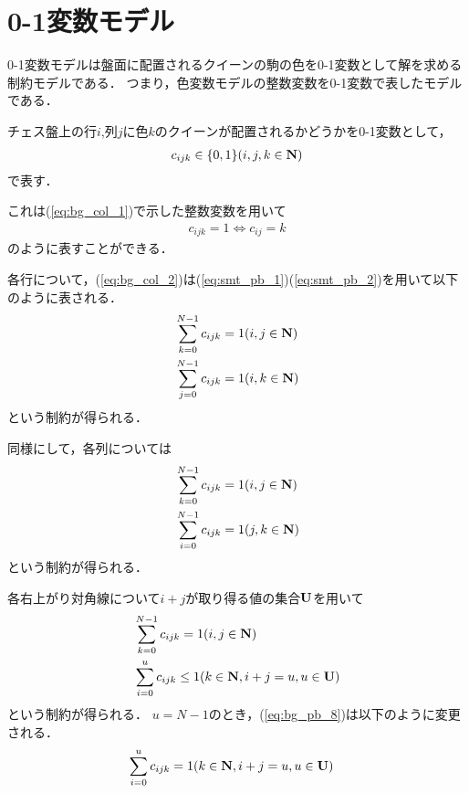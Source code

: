 \section{0-1変数モデル}\label{sec:bg_pb}
0-1変数モデルは盤面に配置されるクイーンの駒の色を0-1変数として解を求める制約モデルである．
つまり，色変数モデルの整数変数を0-1変数で表したモデルである．

チェス盤上の行$i$,列$j$に色$k$のクイーンが配置されるかどうかを0-1変数として，
\begin{eqnarray}
    c_{ijk} \in \{0,1\} (i,j,k \in {\bf N}) \label{eq:bg_pb_1}
\end{eqnarray}
で表す．

これは(\ref{eq:bg_col_1})で示した整数変数を用いて
\begin{eqnarray}
    c_{ijk}=1 \Leftrightarrow c_{ij}=k \label{eq:bg_pb_2}
 \end{eqnarray}
のように表すことができる．

各行について，(\ref{eq:bg_col_2})は(\ref{eq:smt_pb_1})(\ref{eq:smt_pb_2})を用いて以下のように表される．
\begin{eqnarray}
    & \sum_{k=0}^{N-1} c_{ijk} = 1     (i,j \in {\bf N}) \label{eq:bg_pb_3}\\
    & \sum_{j=0}^{N-1} c_{ijk} = 1     (i,k \in {\bf N}) \label{eq:bg_pb_4}
\end{eqnarray}
という制約が得られる．

同様にして，各列については
\begin{eqnarray}
    & \sum_{k=0}^{N-1} c_{ijk} = 1     (i,j \in {\bf N}) \label{eq:bg_pb_5}\\
    & \sum_{i=0}^{N-1} c_{ijk} = 1     (j,k \in {\bf N}) \label{eq:bg_pb_6}
\end{eqnarray}
という制約が得られる．

各右上がり対角線について$i+j$が取り得る値の集合$\bf U$を用いて
\begin{eqnarray}
    & \sum_{k=0}^{N-1} c_{ijk} = 1     (i,j \in {\bf N})    \label{eq:bg_pb_7}\\
    & \sum_{i=0}^{u} c_{ijk} \leq 1  (k \in {\bf N}, i+j=u, u \in {\bf U}) \label{eq:bg_pb_8}
\end{eqnarray}
という制約が得られる．
$u=N-1$のとき，(\ref{eq:bg_pb_8})は以下のように変更される．
\begin{eqnarray}
    & \sum_{i=0}^{u} c_{ijk} = 1  (k \in {\bf N}, i+j=u, u \in {\bf U}) \label{eq:bg_pb_9}
\end{eqnarray}



